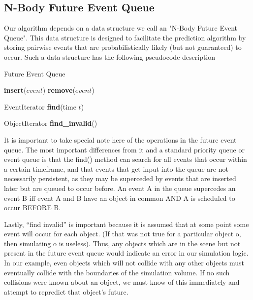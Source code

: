 \documentclass[conference]{IEEEtran}
\begin{document}
\subsection{N-Body Future Event Queue}
\label{sec:neq}
Our algorithm depends on a data structure we call an "N-Body Future Event Queue".  This data structure is designed to facilitate the prediction algorithm
by storing pairwise events that are probabilistically likely (but not guaranteed) to occur.  Such a data structure has the following pseudocode description
\begin{algorithm}
\caption{Future Event Queue}
\begin{algorithmic}
\STATE {}
\STATE \textbf{insert}($event$)
\STATE {}
\STATE \textbf{remove}($event$)
	
\STATE {}
\STATE EventIterator \textbf{find}(time $t$)

\STATE {}
\STATE ObjectIterator \textbf{find\_invalid}()
\end{algorithmic}
\end{algorithm}

It is important to take special note here of the operations in the future event queue.  The most important differences from it and a standard priority queue or event queue
is that the find() method can search for all events that occur within a certain timeframe, and that events that get input into the queue are not necessarily persistent, as they 
may be superceded by events that are inserted later but are queued to occur before.  An event A in the queue supercedes an event B iff event A and B have an object in common AND A is scheduled to occur BEFORE B.

Lastly, ``find invalid'' is important because it is assumed that at some point some event will occur for each object. (If that was not true for a particular object o, then simulating o is 
useless).  Thus, any objects which are in the scene but not present in the future event queue would indicate an error in our simulation logic.  In our example, even objects which
will not collide with any other objects must eventually collide with the boundaries of the simulation volume.  If no such collisions were known about
an object, we must know of this immediately and attempt to repredict that object's future.
\end{document}
